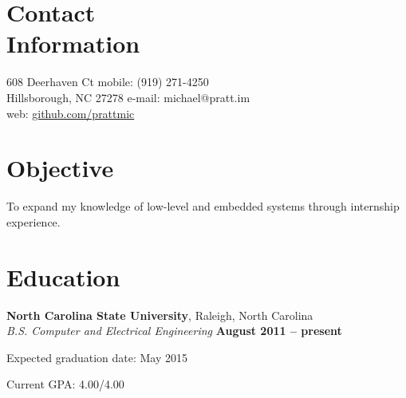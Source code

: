 \documentclass[margin,line,letterpaper]{resume}
\begin{document}
\begin{resume}

    \section{\mysidestyle Contact\\Information}

    608 Deerhaven Ct                \hfill mobile: (919) 271-4250          \vspace{0mm}\\\vspace{0mm}%
    Hillsborough, NC 27278          \hfill e-mail: michael@pratt.im      \vspace{0mm}\\\vspace{0mm}%
                                    \hfill web: \href{http://github.com/prattmic}{github.com/prattmic}      \vspace{0mm}\\\vspace{-4.5mm}%


    \section{\mysidestyle Objective}

    To expand my knowledge of low-level and embedded systems through internship experience.


    \section{\mysidestyle Education}

    \textbf{North Carolina State University}, Raleigh, North Carolina \vspace{2mm}\\\vspace{1mm}%
    \textsl{B.S. Computer and Electrical Engineering} \hfill \textbf{ August 2011 -- present}\vspace{-3mm}\\\vspace{-1mm}%
    \begin{list2}
        \item Expected graduation date: May 2015
        \item Current GPA: 4.00/4.00
    \end{list2}\vspace{-1.5mm}



\end{resume}
\end{document}
